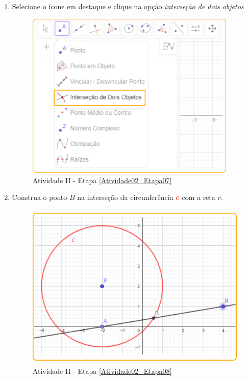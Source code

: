 \documentclass[11pt,a4paper]{article}
\begin{document}
\begin{enumerate}[{Etapa} 1.]
\item Selecione o ícone em destaque e clique na opção {\it interseção de dois objetos} \label{Atividade02_Etapa07}
\begin{figure}[H]
    \centering
    \includegraphics[height=8cm]{Figuras/T01_Elemento05.png}
    \caption{Atividade II - Etapa \ref{Atividade02_Etapa07}}
    \label{Atividade02_Etapa07_Imagem}
\end{figure}

\item Construa o ponto $B$ na interseção da circunferência ${\color{red}{c}}$ com a reta $r$. \label{Atividade02_Etapa08}
\begin{figure}[H]
    \centering
    \includegraphics[height=8cm]{Figuras/T01_Atividade02_Fig04.png}
    \caption{Atividade II - Etapa \ref{Atividade02_Etapa08}}
    \label{Atividade02_Etapa08_Imagem}
\end{figure}


\end{enumerate}
\end{document}
